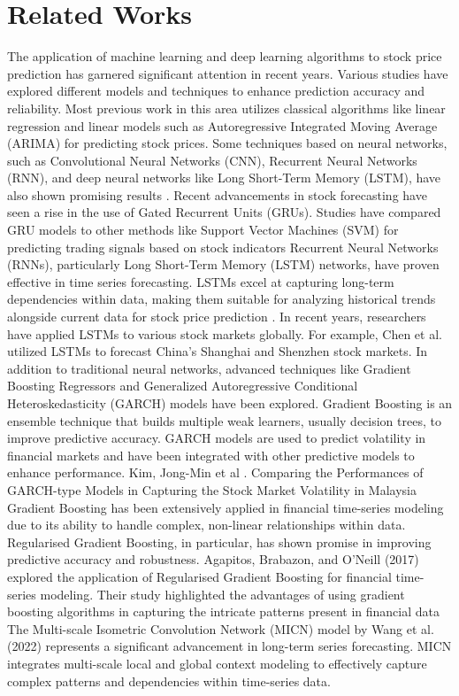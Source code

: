 \documentclass{ieeeojies}
\begin{document}
\section{Related Works}
The application of machine learning and deep learning algorithms to stock price prediction has garnered significant attention in recent years. Various studies have explored different models and techniques to enhance prediction accuracy and reliability.
Most previous work in this area utilizes classical algorithms like linear regression \cite{b3} and linear models such as Autoregressive Integrated Moving Average (ARIMA) \cite{b4} for predicting stock prices.
Some techniques based on neural networks, such as Convolutional Neural Networks (CNN), Recurrent Neural Networks (RNN), and deep neural networks like Long Short-Term Memory (LSTM), have also shown promising results \cite{b5}\cite{b6}.
Recent advancements in stock forecasting have seen a rise in the use of Gated Recurrent Units (GRUs). Studies have compared GRU models to other methods like Support Vector Machines (SVM) for predicting trading signals based on stock indicators \cite{b7}
Recurrent Neural Networks (RNNs), particularly Long Short-Term Memory (LSTM) networks, have proven effective in time series forecasting. LSTMs excel at capturing long-term dependencies within data, making them suitable for analyzing historical trends alongside current data for stock price prediction \cite{b8}\cite{b9}. In recent years, researchers have applied LSTMs to various stock markets globally. For example, Chen et al. \cite{b10} utilized LSTMs to forecast China's Shanghai and Shenzhen stock markets.
In addition to traditional neural networks, advanced techniques like Gradient Boosting Regressors and Generalized Autoregressive Conditional Heteroskedasticity (GARCH) models have been explored. Gradient Boosting is an ensemble technique that builds multiple weak learners, usually decision trees, to improve predictive accuracy. GARCH models are used to predict volatility in financial markets and have been integrated with other predictive models to enhance performance. Kim, Jong-Min  et al \cite{b11}. Comparing the Performances of GARCH-type Models in Capturing the Stock Market Volatility in Malaysia 
Gradient Boosting has been extensively applied in financial time-series modeling due to its ability to handle complex, non-linear relationships within data. Regularised Gradient Boosting, in particular, has shown promise in improving predictive accuracy and robustness. Agapitos, Brabazon, and O’Neill (2017) \cite{b12} explored the application of Regularised Gradient Boosting for financial time-series modeling. Their study highlighted the advantages of using gradient boosting algorithms in capturing the intricate patterns present in financial data
The Multi-scale Isometric Convolution Network (MICN) model by Wang et al. (2022) \cite{b13} represents a significant advancement in long-term series forecasting. MICN integrates multi-scale local and global context modeling to effectively capture complex patterns and dependencies within time-series data.
\end{document}
